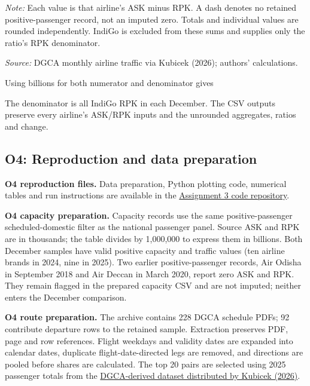 \documentclass[12pt,a4paper]{article}
\begin{document}
\begin{minipage}{\linewidth}
\captionsetup{font=small,labelfont=bf,justification=raggedright,singlelinecheck=false,hypcap=false}
\label{tab:o4-capacity-buffer-airlines}
\centering
{\small{}\par}
\vspace{4pt}
{\footnotesize{}\raggedright\textit{Note:} Each value is that airline's ASK minus RPK. A dash denotes no retained positive-passenger record, not an imputed zero. Totals and individual values are rounded independently. IndiGo is excluded from these sums and supplies only the ratio's RPK denominator.\par
\textit{Source:} DGCA monthly airline traffic via Kubicek (2026); authors' calculations.\par}
\end{minipage}

Using billions for both numerator and denominator gives

The denominator is all IndiGo RPK in each December. The CSV outputs preserve every airline's ASK/RPK inputs and the unrounded aggregates, ratios and change.

\clearpage
\subsection{O4: Reproduction and data preparation}

\textbf{O4 reproduction files.} Data preparation, Python plotting code, numerical tables and run instructions are available in the \href{https://github.com/Goutham7358/Assignment3_Code}{Assignment 3 code repository}.

\textbf{O4 capacity preparation.} Capacity records use the same positive-passenger scheduled-domestic filter as the national passenger panel. Source ASK and RPK are in thousands; the table divides by 1,000,000 to express them in billions. Both December samples have valid positive capacity and traffic values (ten airline brands in 2024, nine in 2025). Two earlier positive-passenger records, Air Odisha in September 2018 and Air Deccan in March 2020, report zero ASK and RPK. They remain flagged in the prepared capacity CSV and are not imputed; neither enters the December comparison.

\textbf{O4 route preparation.} The archive contains 228 DGCA schedule PDFs; 92 contribute departure rows to the retained sample. Extraction preserves PDF, page and row references. Flight weekdays and validity dates are expanded into calendar dates, duplicate flight-date-directed legs are removed, and directions are pooled before shares are calculated. The top 20 pairs are selected using 2025 passenger totals from the \href{https://github.com/mkubicek/india-aviation-stats/tree/16770ac59dae61ce7b80fd8bd67dd7f4cef280a6}{DGCA-derived dataset distributed by Kubicek (2026)}.
\end{document}
